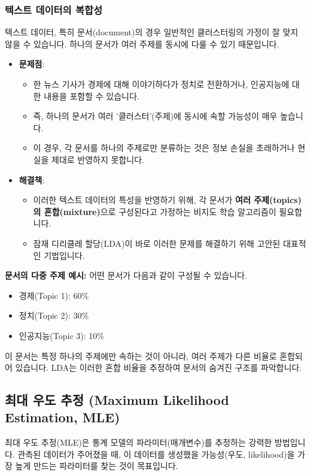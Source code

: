 \documentclass[11pt,a4paper]{article}
\theoremstyle{definition}
\begin{document}
\subsubsection*{텍스트 데이터의 복합성}
\begin{warningbox}
텍스트 데이터, 특히 문서(document)의 경우 일반적인 클러스터링의 가정이 잘 맞지 않을 수 있습니다.
하나의 문서가 여러 주제를 동시에 다룰 수 있기 때문입니다.
\end{warningbox}

\begin{itemize}
    \item \textbf{문제점}:
    \begin{itemize}
        \item 한 뉴스 기사가 경제에 대해 이야기하다가 정치로 전환하거나, 인공지능에 대한 내용을 포함할 수 있습니다.
        \item 즉, 하나의 문서가 여러 '클러스터'(주제)에 동시에 속할 가능성이 매우 높습니다.
        \item 이 경우, 각 문서를 하나의 주제로만 분류하는 것은 정보 손실을 초래하거나 현실을 제대로 반영하지 못합니다.
    \end{itemize}
    \item \textbf{해결책}:
    \begin{itemize}
        \item 이러한 텍스트 데이터의 특성을 반영하기 위해, 각 문서가 \textbf{여러 주제(topics)의 혼합(mixture)}으로 구성된다고 가정하는 비지도 학습 알고리즘이 필요합니다.
        \item 잠재 디리클레 할당(LDA)이 바로 이러한 문제를 해결하기 위해 고안된 대표적인 기법입니다.
    \end{itemize}
\end{itemize}

\begin{examplebox}
\textbf{문서의 다중 주제 예시:}
어떤 문서가 다음과 같이 구성될 수 있습니다.
\begin{itemize}
    \item 경제(Topic 1): 60\%
    \item 정치(Topic 2): 30\%
    \item 인공지능(Topic 3): 10\%
\end{itemize}
이 문서는 특정 하나의 주제에만 속하는 것이 아니라, 여러 주제가 다른 비율로 혼합되어 있습니다. LDA는 이러한 혼합 비율을 추정하여 문서의 숨겨진 구조를 파악합니다.
\end{examplebox}

\newpage
\subsection*{최대 우도 추정 (Maximum Likelihood Estimation, MLE)}
\begin{infobox} %
최대 우도 추정(MLE)은 통계 모델의 파라미터(매개변수)를 추정하는 강력한 방법입니다.
관측된 데이터가 주어졌을 때, 이 데이터를 생성했을 가능성(우도, likelihood)을 가장 높게 만드는 파라미터를 찾는 것이 목표입니다.
\end{infobox}
\end{document}

